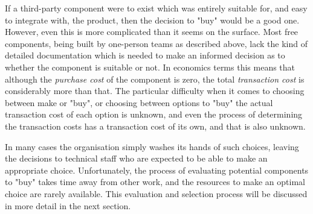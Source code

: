 If a third-party component were to exist which was entirely suitable for, and easy to integrate with, the product, then the decision to "buy" would be a good one. However, even this is more complicated than it seems on the surface. Most free components, being built by one-person teams as described above, lack the kind of detailed documentation which is needed to make an informed decision as to whether the component is suitable or not. In economics terms this means that although the \emph{purchase cost} of the component is zero, the total \emph{transaction cost} \citep{OECD2003} is considerably more than that. The particular difficulty when it comes to choosing between make or "buy", or choosing between options to "buy" the actual transaction cost of each option is unknown, and even the process of determining the transaction costs has a transaction cost of its own, and that is also unknown.

In many cases the organisation simply washes its hands of such choices, leaving the decisions to technical staff who are expected to be able to make an appropriate choice. Unfortunately, the process of evaluating potential components to "buy" takes time away from other work, and the resources to make an optimal choice are rarely available. This evaluation and selection process will be discussed in more detail in the next section.
